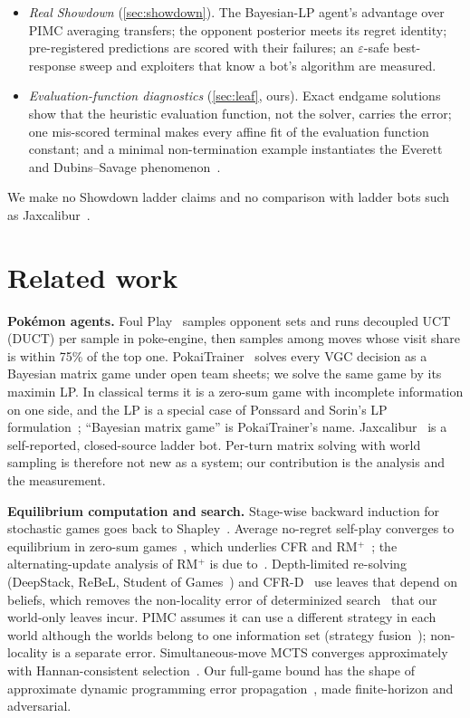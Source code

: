 \documentclass[10pt]{article}
\theoremstyle{plain}
\theoremstyle{definition}
\theoremstyle{remark}
\begin{document}
\begin{itemize}
\item \emph{Real Showdown} (\cref{sec:showdown}). The Bayesian-LP agent's advantage over PIMC averaging transfers; the opponent posterior meets its regret identity; pre-registered predictions are scored with their failures; an $\varepsilon$-safe best-response sweep and exploiters that know a bot's algorithm are measured.
\item \emph{Evaluation-function diagnostics} (\cref{sec:leaf}, ours). Exact endgame solutions show that the heuristic evaluation function, not the solver, carries the error; one mis-scored terminal makes every affine fit of the evaluation function constant; and a minimal non-termination example instantiates the Everett and Dubins--Savage phenomenon~\cite{Everett57,DS65,MS96}.
\end{itemize}
We make no Showdown ladder claims and no comparison with ladder bots such as Jaxcalibur~\cite{jaxcalibur}.

\section{Related work}
\label{sec:related}
\textbf{Pok\'emon agents.} Foul Play~\cite{foulplay} samples opponent sets and runs decoupled UCT (DUCT) per sample in poke-engine, then samples among moves whose visit share is within 75\% of the top one. PokaiTrainer~\cite{Yu26} solves every VGC decision as a Bayesian matrix game under open team sheets; we solve the same game by its maximin LP. In classical terms it is a zero-sum game with incomplete information on one side, and the LP is a special case of Ponssard and Sorin's LP formulation~\cite{PS80}; ``Bayesian matrix game'' is PokaiTrainer's name. Jaxcalibur~\cite{jaxcalibur} is a self-reported, closed-source ladder bot. Per-turn matrix solving with world sampling is therefore not new as a system; our contribution is the analysis and the measurement.

\textbf{Equilibrium computation and search.} Stage-wise backward induction for stochastic games goes back to Shapley~\cite{Shapley53}. Average no-regret self-play converges to equilibrium in zero-sum games~\cite{Hannan57,FS97,CBL06}, which underlies CFR and RM$^+$~\cite{Tam14,Tammelin15}; the alternating-update analysis of RM$^+$ is due to~\cite{BMS19}. Depth-limited re-solving (DeepStack, ReBeL, Student of Games~\cite{Mor17,Bro20,Sch23}) and CFR-D~\cite{CFRD} use leaves that depend on beliefs, which removes the non-locality error of determinized search~\cite{Fra98,Lon10} that our world-only leaves incur. PIMC assumes it can use a different strategy in each world although the worlds belong to one information set (strategy fusion~\cite{Fra98,Lon10}); non-locality is a separate error. Simultaneous-move MCTS converges approximately with Hannan-consistent selection~\cite{Lis13}. Our full-game bound has the shape of approximate dynamic programming error propagation~\cite{Mun07,Sch15,Per15}, made finite-horizon and adversarial.
\end{document}
